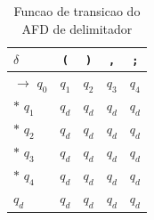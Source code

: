\begin{table}[htb]
\centering
\caption{Funcao de transicao do AFD de delimitador}
\label{tab:afd-delimitador}
\begin{tabular}{l|cccc}
\hline
$\delta$ & \texttt{(} & \texttt{)} & \texttt{,} & \texttt{;} \\
\hline
$\rightarrow$ $q_{0}$ & $q_{1}$ & $q_{2}$ & $q_{3}$ & $q_{4}$ \\
$*$ $q_{1}$ & $q_{d}$ & $q_{d}$ & $q_{d}$ & $q_{d}$ \\
$*$ $q_{2}$ & $q_{d}$ & $q_{d}$ & $q_{d}$ & $q_{d}$ \\
$*$ $q_{3}$ & $q_{d}$ & $q_{d}$ & $q_{d}$ & $q_{d}$ \\
$*$ $q_{4}$ & $q_{d}$ & $q_{d}$ & $q_{d}$ & $q_{d}$ \\
$q_{d}$ & $q_{d}$ & $q_{d}$ & $q_{d}$ & $q_{d}$ \\
\hline
\end{tabular}
\end{table}

